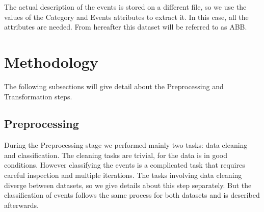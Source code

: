 The actual description of the events is stored on a different file, so we use the values of the Category and Events attributes to extract it. In this case, all the attributes are needed. From hereafter this dataset will be referred to as ABB.

\section{Methodology}

The following subsections will give detail about the Preprocessing and Transformation steps.

\subsection{Preprocessing}
During the Preprocessing stage we performed mainly two tasks: data cleaning and classification. The cleaning tasks are trivial, for the data is in good conditions. However classifying the events is a complicated task that requires careful inspection and multiple iterations. The tasks involving data cleaning diverge between datasets, so we give details about this step separately. But the classification of events follows the same process for both datasets and is described afterwards.

